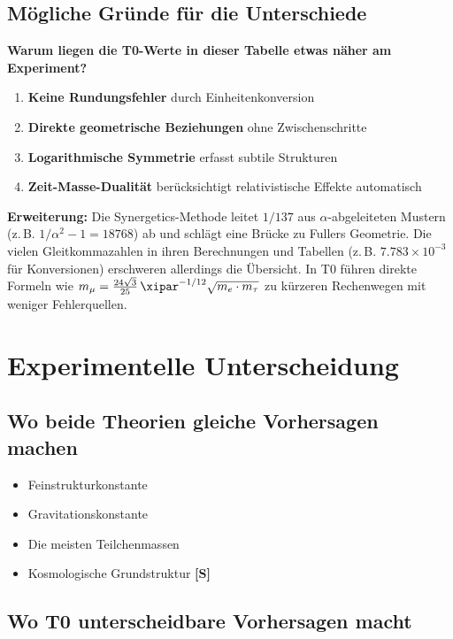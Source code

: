 	
	
	\subsection{Mögliche Gründe für die Unterschiede}
	
	\textbf{Warum liegen die T0-Werte in dieser Tabelle etwas näher am Experiment?}
	
	\begin{enumerate}
		\item \textbf{Keine Rundungsfehler} durch Einheitenkonversion
		\item \textbf{Direkte geometrische Beziehungen} ohne Zwischenschritte
		\item \textbf{Logarithmische Symmetrie} erfasst subtile Strukturen
		\item \textbf{Zeit-Masse-Dualität} berücksichtigt relativistische Effekte automatisch
	\end{enumerate}
	
	\textbf{Erweiterung:} Die Synergetics-Methode leitet $1/137$ aus $\alpha$-abgeleiteten Mustern (z.\,B. $1/\alpha^2 - 1 = 18768$) ab und schlägt eine Brücke zu Fullers Geometrie. Die vielen Gleitkommazahlen in ihren Berechnungen und Tabellen (z.\,B. $7.783 \times 10^{-3}$ für Konversionen) erschweren allerdings die Übersicht. In T0 führen direkte Formeln wie $m_\mu = \frac{24\sqrt3}{25}\,\xipar^{-1/12}\sqrt{m_e \cdot m_\tau}$ zu kürzeren Rechenwegen mit weniger Fehlerquellen.
	
	\section{Experimentelle Unterscheidung}
	
	\subsection{Wo beide Theorien gleiche Vorhersagen machen}
	
	\begin{itemize}
		\item Feinstrukturkonstante
		\item Gravitationskonstante
		\item Die meisten Teilchenmassen
		\item Kosmologische Grundstruktur \textbf{[S]}
	\end{itemize}
	
	\subsection{Wo T0 unterscheidbare Vorhersagen macht}
	

